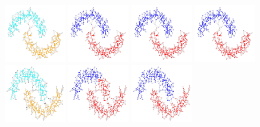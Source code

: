 \documentclass[11pt,twoside]{article}
\newcommand{\1}{\mathbf{1}}
\begin{document}
\begin{figure}
	\centering
	\includegraphics[width=0.24\textwidth,scale = .5]{plots/experiment_2/row1_true_density_cluster}
	\includegraphics[width=0.24\textwidth]{plots/experiment_2/row1_ppr_cluster}
	\includegraphics[width=0.24\textwidth]{plots/experiment_2/row1_conductance_cluster}
	\includegraphics[width=0.24\textwidth]{plots/experiment_2/row1_density_cluster}
	\includegraphics[width=0.24\textwidth]{plots/experiment_2/row2_true_density_cluster}
	\includegraphics[width=0.24\textwidth]{plots/experiment_2/row2_ppr_cluster}
	\includegraphics[width=0.24\textwidth]{plots/experiment_2/row2_conductance_cluster}

\end{figure}
\end{document}
